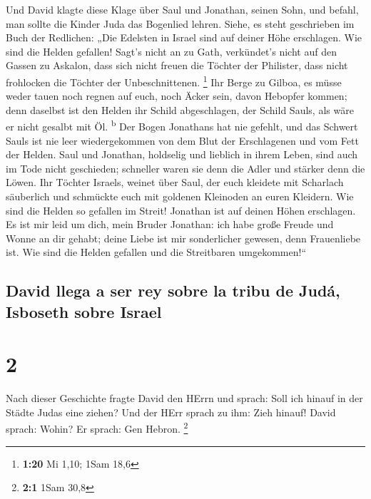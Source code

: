  Und David klagte diese Klage über Saul und Jonathan,
seinen Sohn,  und befahl, man sollte die Kinder Juda das
Bogenlied lehren. Siehe, es steht geschrieben im Buch der Redlichen:
 „Die Edelsten in Israel sind auf deiner Höhe erschlagen.
Wie sind die Helden gefallen!  Sagt's nicht an zu Gath,
verkündet's nicht auf den Gassen zu Askalon, dass sich nicht freuen die
Töchter der Philister, dass nicht frohlocken die Töchter der
Unbeschnittenen. \footnote{\textbf{1:20} Mi 1,10; 1Sam 18,6}
 Ihr Berge zu Gilboa, es müsse weder tauen noch regnen
auf euch, noch Äcker sein, davon Hebopfer kommen; denn daselbst ist den
Helden ihr Schild abgeschlagen, der Schild Sauls, als wäre er nicht
gesalbt mit Öl. \textsuperscript{b}  Der Bogen Jonathans
hat nie gefehlt, und das Schwert Sauls ist nie leer wiedergekommen von
dem Blut der Erschlagenen und vom Fett der Helden.  Saul
und Jonathan, holdselig und lieblich in ihrem Leben, sind auch im Tode
nicht geschieden; schneller waren sie denn die Adler und stärker denn
die Löwen.  Ihr Töchter Israels, weinet über Saul, der
euch kleidete mit Scharlach säuberlich und schmückte euch mit goldenen
Kleinoden an euren Kleidern.  Wie sind die Helden so
gefallen im Streit! Jonathan ist auf deinen Höhen erschlagen.
 Es ist mir leid um dich, mein Bruder Jonathan: ich habe
große Freude und Wonne an dir gehabt; deine Liebe ist mir sonderlicher
gewesen, denn Frauenliebe ist.  Wie sind die Helden
gefallen und die Streitbaren umgekommen!{}``

\hypertarget{david-llega-a-ser-rey-sobre-la-tribu-de-juduxe1-isboseth-sobre-israel}{%
\subsection{David llega a ser rey sobre la tribu de Judá, Isboseth sobre
Israel}\label{david-llega-a-ser-rey-sobre-la-tribu-de-juduxe1-isboseth-sobre-israel}}

\hypertarget{section-1}{%
\section{2}\label{section-1}}

 Nach dieser Geschichte fragte David den HErrn und sprach:
Soll ich hinauf in der Städte Judas eine ziehen? Und der HErr sprach zu
ihm: Zieh hinauf! David sprach: Wohin? Er sprach: Gen Hebron.
\footnote{\textbf{2:1} 1Sam 30,8}

